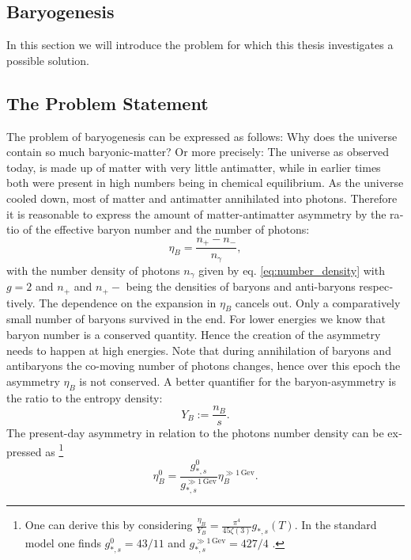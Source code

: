 \documentclass[master,       %
               twoside,        %
               BCOR10mm,       %
               english,ngerman, %
               ]{GAUBM}
\begin{document}
\begin{otherlanguage}{english}
\chapter{Baryogenesis}

In this section we will introduce the problem for which this thesis investigates a possible solution.

\section{The Problem Statement}
The problem of baryogenesis can be expressed as follows: Why does the universe contain so much baryonic-matter? Or more precisely: The universe as observed today, is made up of matter with very little antimatter, while in earlier times both were present in high numbers being in chemical equilibrium. As the universe cooled down, most of matter and antimatter annihilated into photons. Therefore it is reasonable to express the amount of matter-antimatter asymmetry by the ratio of the effective baryon number and the number of photons:
\begin{equation}
	\eta_B = \frac{n_+ - n_-}{n_\gamma},
\end{equation}
with the number density of photons $n_\gamma$ given by eq. \eqref{eq:number_density} with $g = 2$
and $n_+$ and $n_+-$ being the densities of baryons and anti-baryons respectively. 
The dependence on the expansion in $\eta_B$ cancels out.
Only a comparatively small number of baryons survived in the end.
For lower energies we know that baryon number is a conserved quantity. Hence the creation of the asymmetry needs to happen at high energies.
Note that during annihilation of baryons and antibaryons the co-moving number of photons changes, hence over this epoch the asymmetry $\eta_B$ is not conserved. A better quantifier for the baryon-asymmetry
is the ratio to the entropy density:
\begin{equation}
	\label{eq:baryon_abundance}
	Y_B := \frac{n_B}{s}.
\end{equation}
The present-day asymmetry in relation to the photons number density can be expressed as \footnote{
One can derive this by considering $\frac{\eta_B}{Y_B} = \frac{\pi^4}{45 \zeta(3)} g_{*, s}(T)$.
In the standard model one finds $g_{*,s}^0 = 43/11$ and $g_{*, s}^{\gg 1 \, \mathrm{Gev}} = 427/4$ \cite[sec. 3.4]{the_early_universe_kolb_and_turner}.
}
\begin{equation}
	\eta_B^0 = \frac{g_{*,s}^0}{g_{*, s}^{\gg 1 \, \mathrm{Gev}}} \eta_B^{\gg 1 \, \mathrm{Gev}}.
\end{equation}


\end{otherlanguage}
\end{document}
